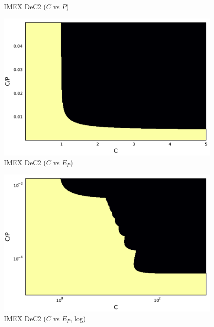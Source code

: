 \begin{example}
\begin{figure}
\begin{minipage}[t]{0.32\textwidth}
			IMEX DeC2 ($C$ vs $P$)
		\end{minipage}
		\begin{minipage}[t]{0.32\textwidth}
		\centering
		\includegraphics[width=\textwidth]{pdf/pdepics/disp/contourf_adv_disp_IMEXDeC_gaussLobatto_2_disp_CFD_adv_1_CE.pdf}
		IMEX DeC2 ($C$ vs $E_P$)
		\end{minipage}
		\begin{minipage}[t]{0.32\textwidth}
		\centering
		\includegraphics[width=\textwidth]{pdf/pdepics/disp/contourf_adv_disp_IMEXDeC_gaussLobatto_2_disp_CFD_adv_1_CE_zoom.pdf}
		IMEX DeC2 ($C$ vs $E_P$, log)
		\end{minipage}\\
		\begin{minipage}[t]{0.32\textwidth}
			\centering

\end{minipage}
\end{figure}
\end{example}
